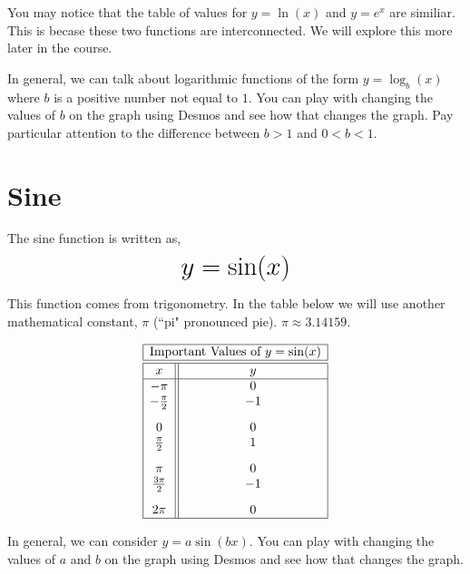 \documentclass[nooutcomes]{ximera}
\begin{document}
You may notice that the table of values for $y=\ln(x)$ and $y=e^x$ are similiar.  This is becase these two functions are interconnected.  We will explore this more later in the course.



In general, we can talk about logarithmic functions of the form $y=\log_b(x)$ where $b$ is a positive number not equal to $1$.  You can play with changing the values of $b$ on the graph using Desmos and see how that changes the graph.  Pay particular attention to the difference between $b>1$ and $0<b<1$.

\begin{center}  
\end{center}



\newpage


\section{Sine}
The sine function is written as, $$ \mbox{\huge $y=\sin(x)$}$$ 


This function comes from trigonometry. In the table below we will use another mathematical constant, $\pi$ (``pi" pronounced pie). $\pi \approx 3.14159$.

\begin{image}
\end{image}

$$
\begin{array}{ |c || c|  }
 \hline
 \multicolumn{2}{|c|}{\text{\normalfont Important Values of } y=\sin(x)} \\
\hline
 \hline
 x & y\\
 \hline
 -\pi&0\\
 -\frac{\pi}{2}&-1\\[2ex]
 0&0\\
 \frac{\pi}{2}&1\\[2ex]
 \pi&0\\
\frac{3\pi}{2}&-1\\[2ex]
 2 \pi&0\\
\hline
\end{array}
$$


In general, we can consider $y=a\sin(bx)$.  You can play with changing the values of $a$ and $b$ on the graph using Desmos and see how that changes the graph.  

\begin{center}  
\end{center}
\end{document}

